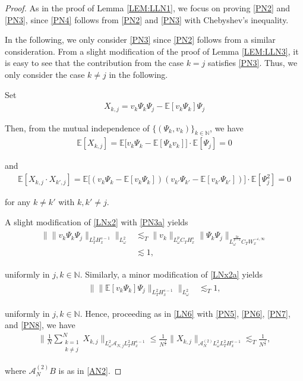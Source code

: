 \documentclass[10pt,a4paper]{amsart}
\newcommand{\A}{\mathcal{A}}
\newcommand{\E}{\mathbb{E}}
\newcommand{\N}{\mathbb{N}}
\newcommand{\eps}{\varepsilon}
\newcommand{\les}{\lesssim}
\newcommand{\noi}{\noindent}
\renewcommand{\o}{\omega}
\begin{document}
\begin{proof}
As in the proof of Lemma \ref{LEM:LLN1}, 
we focus on proving \eqref{PN2}
and \eqref{PN3}, since \eqref{PN4}
follows from 
\eqref{PN2}
and \eqref{PN3} with Chebyshev's inequality.

In the following, we only consider \eqref{PN3} since \eqref{PN2} follows
from a similar consideration.
From a slight modification of the proof of Lemma \ref{LEM:LLN3}, 
it is easy to see that 
the contribution from the case $k = j$
satisfies  \eqref{PN3}. 
Thus, we only consider the case $k \ne j$ in the following.


Set
\begin{align*}
X_{k, j} = v_k \Psi_k \Psi_j -  \E [v_k\Psi_k ] \Psi_j
\end{align*}

\noi
Then, 
from the mutual independence of $\{(\Psi_k, v_k)\}_{k \in \N}$, %
we have
\begin{align}
\E[X_{k, j}]
 = 
\E\big[v_k  \Psi_k  -  \E [\Psi_k v_k]\big] \cdot \E[ \Psi_j]
 = 0
\label{PN5}
\end{align}

\noi
and 
\begin{align}
\E[X_{k, j}\cdot X_{k', j}]
 = 
\E\big[(v_k  \Psi_k  -  \E [v_k \Psi_k ])(v_{k'}  \Psi_{k'}  -  \E [v_{k'}\Psi_{k'} ])\big] \cdot \E[ \Psi_j^2]
 = 0
\label{PN6}
\end{align}

\noi
for any $k \ne k'$ with $k, k' \ne j$.


A slight modification of \eqref{LNx2} 
with \eqref{PN3a} yields
\begin{align}
\begin{split}
\Big\| \| v_k \Psi_k \Psi_j \|_{L_T^2 H_x^{s-1}} \Big\|_{L^2_\o}
&\les_T  \| v_k \|_{L^p_\o C_T  H_x^{s}}
 \|  \Psi_k \Psi_j \|_{L^\frac{2p}{p-2}_\o C_T  W_x^{- \eps, \infty}}\\
 & \les 1,  
\end{split}
\label{PN7}
\end{align}


\noi
uniformly in $j, k \in \N$.
Similarly, 
a minor modification of \eqref{LNx2a} yields
\begin{align}
\begin{split}
 \Big\| \| \E [ v_k \Psi_k ] \Psi_j \|_{L_T^2 H_x^{s-1}} \Big\|_{L^2_\o}
 & \les_T 1, 
\end{split}
\label{PN8}
\end{align}

\noi
uniformly in $j, k \in \N$.
Hence, proceeding as in \eqref{LN6} with 
\eqref{PN5}, \eqref{PN6}, 
\eqref{PN7},  and \eqref{PN8}, 
we have 
\begin{align*}
\bigg\| \frac 1N \sum_{\substack{k = 1\\k \ne j}}^N X_{k, j}
\bigg\|_{L^2_\o\A_{N, j}L_T^2 H_x^{s-1}}
\le \frac 1{N^\frac 12}
\|  X_{k, j}\|_{\A_{N}^{(2)}L^2_\o L_T^2 H_x^{s-1}}
\les_T \frac 1{N^\frac 12}, 
\end{align*}

\noi
where $\A_{N}^{(2)}B$ is as in \eqref{AN2}.
\end{proof}
\end{document}
